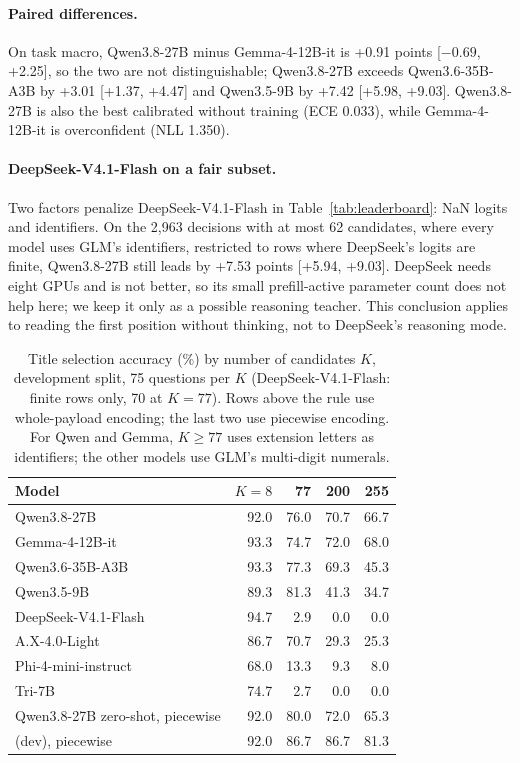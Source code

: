 \paragraph{Paired differences.}
On task macro, Qwen3.8-27B minus Gemma-4-12B-it is +0.91 points [$-0.69$, +2.25], so the two
are not distinguishable; Qwen3.8-27B exceeds Qwen3.6-35B-A3B by +3.01 [+1.37, +4.47] and
Qwen3.5-9B by +7.42 [+5.98, +9.03]. Qwen3.8-27B is also the best calibrated without training
(ECE 0.033), while Gemma-4-12B-it is overconfident (NLL 1.350).

\paragraph{DeepSeek-V4.1-Flash on a fair subset.}
Two factors penalize DeepSeek-V4.1-Flash in Table~\ref{tab:leaderboard}: NaN logits and
identifiers. On the 2,963 decisions with at most 62 candidates, where every model uses GLM's
identifiers, restricted to rows where DeepSeek's logits are finite, Qwen3.8-27B still leads
by +7.53 points [+5.94, +9.03]. DeepSeek needs eight GPUs and is not better, so its small
prefill-active parameter count does not help here; we keep it only as a possible reasoning
teacher. This conclusion applies to reading the first position without thinking, not to
DeepSeek's reasoning mode.

\begin{table}[t]
\centering
\small
\caption{Title selection accuracy (\%) by number of candidates $K$, development split,
75 questions per $K$ (DeepSeek-V4.1-Flash: finite rows only, 70 at $K=77$). Rows above the
rule use whole-payload encoding; the last two use piecewise encoding. For Qwen and Gemma,
$K\ge77$ uses extension letters as identifiers; the other models use GLM's multi-digit
numerals.}
\label{tab:kscaling}
\begin{tabular}{@{}lrrrr@{}}
\toprule
Model & $K=8$ & 77 & 200 & 255 \\
\midrule
Qwen3.8-27B & 92.0 & 76.0 & 70.7 & 66.7 \\
Gemma-4-12B-it & 93.3 & 74.7 & 72.0 & 68.0 \\
Qwen3.6-35B-A3B & 93.3 & 77.3 & 69.3 & 45.3 \\
Qwen3.5-9B & 89.3 & 81.3 & 41.3 & 34.7 \\
DeepSeek-V4.1-Flash & 94.7 & 2.9 & 0.0 & 0.0 \\
A.X-4.0-Light & 86.7 & 70.7 & 29.3 & 25.3 \\
Phi-4-mini-instruct & 68.0 & 13.3 & 9.3 & 8.0 \\
Tri-7B & 74.7 & 2.7 & 0.0 & 0.0 \\
\midrule
Qwen3.8-27B zero-shot, piecewise & 92.0 & 80.0 & 72.0 & 65.3 \\
\expone{} (dev), piecewise & 92.0 & 86.7 & 86.7 & 81.3 \\
\bottomrule
\end{tabular}
\end{table}

